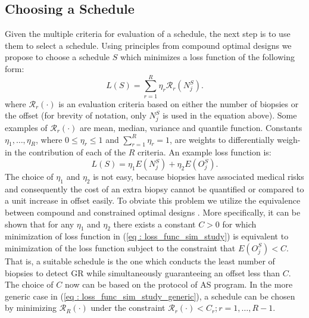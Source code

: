 \subsection{Choosing a Schedule}
Given the multiple criteria for evaluation of a schedule, the next step is to use them to select a schedule. Using principles from compound optimal designs \citep{lauter1976optimal} we propose to choose a schedule $S$ which minimizes a loss function of the following form:
\begin{equation}
\label{eq : loss_func_sim_study_generic}
L(S) = \sum_{r=1}^R \eta_r \mathcal{R}_r(N^S_j).
\end{equation}
where $\mathcal{R}_r(\cdot)$ is an evaluation criteria based on either the number of biopsies or the offset (for brevity of notation, only $N^S_j$ is used in the equation above). Some examples of $\mathcal{R}_r(\cdot)$ are mean, median, variance and quantile function. Constants $\eta_1, \ldots, \eta_R$, where $0 \leq \eta_r \leq 1$ and $\sum_{r=1}^R \eta_r = 1$, are weights to differentially weigh-in the contribution of each of the $R$ criteria. An example loss function is:
\begin{equation}
\label{eq : loss_func_sim_study}
L(S) = \eta_1 E(N^S_j) + \eta_2 E(O^S_j). 
\end{equation}
The choice of $\eta_1$ and $\eta_2$ is not easy, because biopsies have associated medical risks and consequently the cost of an extra biopsy cannot be quantified or compared to a unit increase in offset easily. To obviate this problem we utilize the equivalence between compound and constrained optimal designs \citep{cook1994equivalence}. More specifically, it can be shown that for any $\eta_1$ and $\eta_2$ there exists a constant $C>0$ for which minimization of loss function in (\ref{eq : loss_func_sim_study}) is equivalent to minimization of the loss function subject to the constraint that $E(O^S_j) < C$. That is, a suitable schedule is the one which conducts the least number of biopsies to detect GR while simultaneously guaranteeing an offset less than $C$. The choice of $C$ now can be based on the protocol of AS program. In the more generic case in (\ref{eq : loss_func_sim_study_generic}), a schedule can be chosen by minimizing $\mathcal{R}_R(\cdot)$ under the constraint $\mathcal{R}_r(\cdot) < C_r; r=1, \ldots, R-1$.